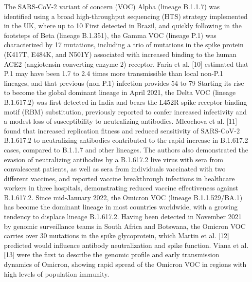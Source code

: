 The SARS-CoV-2 variant of concern (VOC) Alpha (lineage B.1.1.7) was identified using a broad high-throughput sequencing (HTS) strategy implemented in the UK, where up to 10%
First detected in Brazil, and quickly following in the footsteps of Beta (lineage B.1.351), the Gamma VOC (lineage P.1) was characterized by 17 mutations, including a trio of mutations in the spike protein (K417T, E484K, and N501Y) associated with increased binding to the human ACE2 (angiotensin-converting enzyme 2) receptor. Faria et al. [10] estimated that P.1 may have been 1.7 to 2.4 times more transmissible than local non-P.1 lineages, and that previous (non-P.1) infection provides 54 to 79%
Starting its rise to become the global dominant lineage in April 2021, the Delta VOC (lineage B.1.617.2) was first detected in India and bears the L452R spike receptor-binding motif (RBM) substitution, previously reported to confer increased infectivity and a modest loss of susceptibility to neutralizing antibodies. Mlcochova et al. [11] found that increased replication fitness and reduced sensitivity of SARS-CoV-2 B.1.617.2 to neutralizing antibodies contributed to the rapid increase in B.1.617.2 cases, compared to B.1.1.7 and other lineages. The authors also demonstrated the evasion of neutralizing antibodies by a B.1.617.2 live virus with sera from convalescent patients, as well as sera from individuals vaccinated with two different vaccines, and reported vaccine breakthrough infections in healthcare workers in three hospitals, demonstrating reduced vaccine effectiveness against B.1.617.2.
Since mid-January 2022, the Omicron VOC (lineage B.1.1.529/BA.1) has become the dominant lineage in most countries worldwide, with a growing tendency to displace lineage B.1.617.2. Having been detected in November 2021 by genomic surveillance teams in South Africa and Botswana, the Omicron VOC carries over 30 mutations in the spike glycoprotein, which Martin et al. [12] predicted would influence antibody neutralization and spike function. Viana et al. [13] were the first to describe the genomic profile and early transmission dynamics of Omicron, showing rapid spread of the Omicron VOC in regions with high levels of population immunity.
